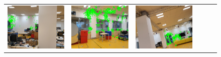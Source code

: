 \documentclass[twoside]{ctuthesis}
\theoremstyle{plain}
\theoremstyle{definition}
\theoremstyle{note}
\begin{document}
\newcommand{\thiswidth}{0.160\linewidth} 
{\tabcolsep=1pt
\begin{figure}
    \centering
    {\footnotesize
    \begin{tabular}{c|c|c|c|c|c}
    \includegraphics[width=\thiswidth]{evaluation/queryPipeline/3.jpg/query_3} & 
    \includegraphics[width=\thiswidth]{evaluation/queryPipeline/6.jpg/query_6} & 
    \includegraphics[width=\thiswidth]{evaluation/queryPipeline/31.jpg/query_31} & 

\end{tabular}}
\end{figure}}
\end{document}
